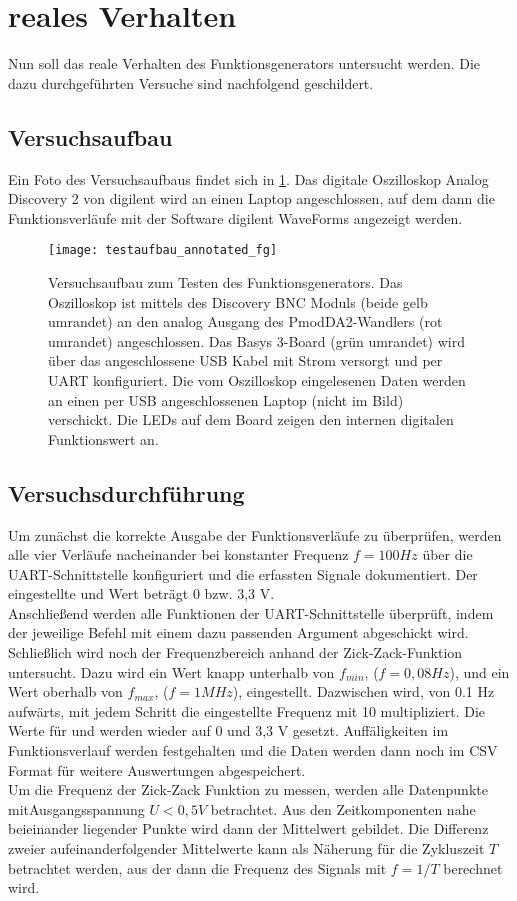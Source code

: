 \section{reales Verhalten}
Nun soll das reale Verhalten des Funktionsgenerators untersucht werden.
Die dazu durchgeführten Versuche sind nachfolgend geschildert.

\subsection{Versuchsaufbau}
Ein Foto des Versuchsaufbaus findet sich in \cref{test:real:setup:pic}.
Das digitale Oszilloskop Analog Discovery 2 von digilent wird an einen Laptop angeschlossen, auf dem dann die Funktionsverläufe mit der Software digilent WaveForms angezeigt werden.

\begin{figure}[h] \centering
  \texttt{[image: testaufbau\_annotated\_fg]}
  \caption{Versuchsaufbau zum Testen des Funktionsgenerators. Das Oszilloskop ist mittels des Discovery BNC Moduls (beide gelb umrandet) an den analog Ausgang des PmodDA2-Wandlers (rot umrandet) angeschlossen. Das Basys 3-Board (grün umrandet) wird über das angeschlossene USB Kabel mit Strom versorgt und per UART konfiguriert. Die vom Oszilloskop eingelesenen Daten werden an einen per USB angeschlossenen Laptop (nicht im Bild) verschickt. Die LEDs auf dem Board zeigen den internen digitalen Funktionswert an.}
  \label{test:real:setup:pic}
\end{figure}

\subsection{Versuchsdurchführung}
Um zunächst die korrekte Ausgabe der Funktionsverläufe zu überprüfen, werden alle vier Verläufe nacheinander bei konstanter Frequenz $f=100Hz$ über die UART-Schnittstelle konfiguriert und die erfassten Signale dokumentiert.
Der eingestellte  und  Wert beträgt 0 bzw. 3,3 V.\\
Anschließend werden alle Funktionen der UART-Schnittstelle überprüft, indem der jeweilige Befehl mit einem dazu passenden Argument abgeschickt wird. \\
Schließlich wird noch der Frequenzbereich anhand der Zick-Zack-Funktion untersucht.
Dazu wird ein Wert knapp unterhalb von $f_{min}$, ($f = 0,08Hz$), und ein Wert oberhalb von $f_{max}$, ($f = 1MHz$), eingestellt.
Dazwischen wird, von 0.1 Hz aufwärts, mit jedem Schritt die eingestellte Frequenz mit 10 multipliziert.
Die Werte für  und  werden wieder auf 0 und 3,3 V gesetzt.
Auffäligkeiten im Funktionsverlauf werden festgehalten und die Daten werden dann noch im CSV Format für weitere Auswertungen abgespeichert. \\
Um die Frequenz der Zick-Zack Funktion zu messen, werden alle Datenpunkte mitAusgangsspannung $U < 0,5 V$ betrachtet.
Aus den Zeitkomponenten nahe beieinander liegender Punkte wird dann der Mittelwert gebildet.
Die Differenz zweier aufeinanderfolgender Mittelwerte kann als Näherung für die Zykluszeit $T$ betrachtet werden, aus der dann die Frequenz des Signals mit $f = 1 / T$ berechnet wird.

